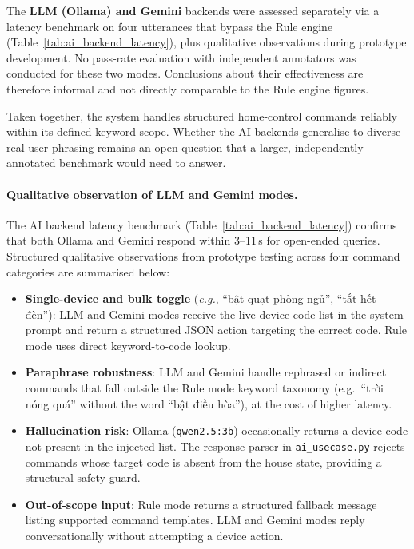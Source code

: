 The \textbf{LLM (Ollama) and Gemini} backends were assessed separately via a latency benchmark on four utterances that bypass the Rule engine (Table~\ref{tab:ai_backend_latency}), plus qualitative observations during prototype development. No pass-rate evaluation with independent annotators was conducted for these two modes. Conclusions about their effectiveness are therefore informal and not directly comparable to the Rule engine figures.

Taken together, the system handles structured home-control commands reliably within its defined keyword scope. Whether the AI backends generalise to diverse real-user phrasing remains an open question that a larger, independently annotated benchmark would need to answer.

\paragraph{Qualitative observation of LLM and Gemini modes.}
The AI backend latency benchmark (Table~\ref{tab:ai_backend_latency}) confirms that both Ollama and Gemini respond within 3--11\,s for open-ended queries. Structured qualitative observations from prototype testing across four command categories are summarised below:

\begin{itemize}[nosep]
    \item \textbf{Single-device and bulk toggle} (\textit{e.g.}, ``bật quạt phòng ngủ'',
    ``tắt hết đèn''): LLM and Gemini modes receive the live device-code list
    in the system prompt and return a structured JSON action targeting the
    correct code. Rule mode uses direct keyword-to-code lookup.

    \item \textbf{Paraphrase robustness}: LLM and Gemini handle rephrased or
    indirect commands that fall outside the Rule mode keyword taxonomy
    (e.g.\ ``trời nóng quá'' without the word ``bật điều hòa''), at the cost
    of higher latency.

    \item \textbf{Hallucination risk}: Ollama (\texttt{qwen2.5:3b}) occasionally
    returns a device code not present in the injected list. The response parser
    in \texttt{ai\_usecase.py} rejects commands whose target code is absent
    from the house state, providing a structural safety guard.

    \item \textbf{Out-of-scope input}: Rule mode returns a structured fallback
    message listing supported command templates. LLM and Gemini modes reply
    conversationally without attempting a device action.
\end{itemize}

